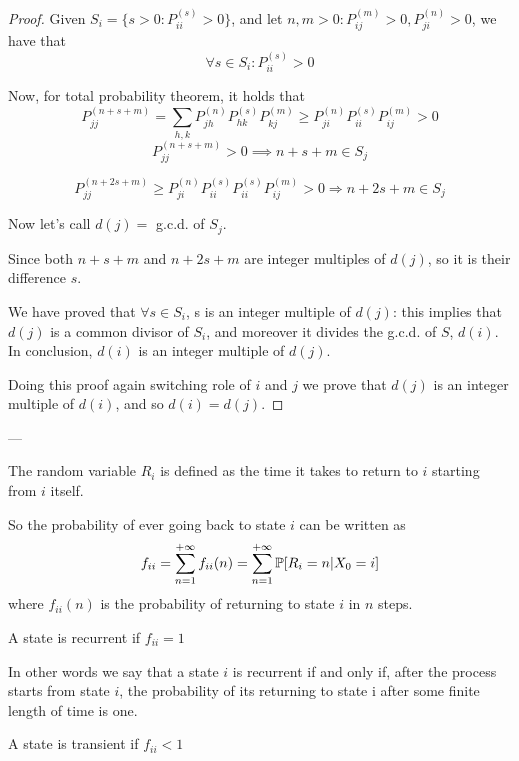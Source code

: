 	\begin{proof}
		Given $S_i = \{ s>0 : P_{ii}^{(s)} >0 \}$, and let $n, m > 0 : P_{ij}^{(m)} > 0, P_{ji}^{(n)} > 0$, we have that $$\forall s \in S_i : P_{ii}^{(s)} > 0$$

		Now, for total probability theorem, it holds that
		$$ P_{jj}^{(n+s+m)} = \sum\limits_{h, k} P_{jh}^{(n)} P_{hk}^{(s)} P_{kj}^{(m)} \geq P_{ji}^{(n)} P_{ii}^{(s)} P_{ij}^{(m)} >0 $$
		$$ P_{jj}^{(n+s+m)} >0 \implies n+s+m \in S_j$$

		$$P_{jj}^{(n+2s+m)} \geq P_{ji}^{(n)} P_{ii}^{(s)} P_{ii}^{(s)} P_{ij}^{(m)} >0 \Rightarrow n+2s+m \in S_j$$

		Now let's call $d(j) =$ g.c.d. of $S_j$.

		Since both $n+s+m$ and $n+2s+m$ are integer multiples of $d(j)$, so it is their difference $s$.

		We have proved that $\forall s \in S_i$, s is an integer multiple of $d(j)$: this implies that $d(j)$ is a common divisor of $S_i$, and moreover it divides the g.c.d. of $S$, $d(i)$. In conclusion, $d(i)$ is an integer multiple of $d(j)$.

		Doing this proof again switching role of $i$ and $j$ we prove that $d(j)$ is an integer multiple of $d(i)$, and so $d(i) = d(j)$.
	\end{proof}
	---

	\begin{definition}
		The random variable $R_i$ is defined as the time it takes to return to $i$ starting from $i$ itself.
	\end{definition}

	So the probability of ever going back to state $i$ can be written as
	$$ f_{ii} = \sum\limits_{n=1}^{+\infty} f_{ii}(n)  = \sum\limits_{n=1}^{+\infty} \mathbb{P}[R_i=n | X_0=i] $$
	where $f_{ii}(n)$ is the probability of returning to state $i$ in $n$ steps.

	\begin{definition}
		A state is recurrent if $f_{ii} = 1$
	\end{definition}
	In other words we say that a state $i$ is recurrent if and only if, after the process starts from state $i$, the probability of its returning to state i after some finite length of time is one.

	\begin{definition}
		A state is transient if  $f_{ii} < 1$
	\end{definition}

